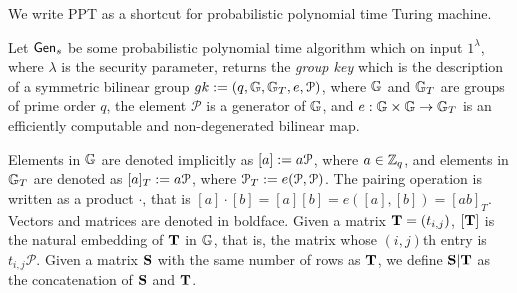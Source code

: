 We write PPT as a shortcut for probabilistic polynomial time Turing machine.

Let $\mathsf{Gen}_s$ be some probabilistic polynomial time algorithm which on input $1^{\lambda}$, where $\lambda$ is the security parameter, returns the \emph{group key} which is the description of a symmetric bilinear group $gk:=(q,\mathbb{G},\mathbb{G}_T,e,\mathcal{P})$, where $\mathbb{G}$
and $\mathbb{G}_T$ are groups of prime order $q$, the element $\mathcal{P}$ is a generator of 
$\mathbb{G}$, and $e:\mathbb{G}\times\mathbb{G}\to\mathbb{G}_T$ is an efficiently computable and non-degenerated bilinear map.

Elements in $\mathbb{G}$ are denoted implicitly as $[a]:=a \mathcal{P}$, where $a\in\mathbb{Z}_q$, and elements in $\mathbb{G}_T$ are denoted as $[a]_T:=a\mathcal{P}$, where $\mathcal{P}_T:=e(\mathcal{P},\mathcal{P})$. 
The pairing operation is written as a product $\cdot$, that is $[a] \cdot [b]=[a] [b]=e([a],[b])=[ab]_T$. Vectors and matrices are denoted in boldface. Given a matrix $\mathbf{{T}}=(t_{i,j})$, $[\mathbf{{T}}]$ is
the natural embedding of $\mathbf{{T}}$ in $\mathbb{G}$, that is, the matrix whose $(i,j)$th entry is $t_{i,j}\mathcal{P}$. Given a matrix $\mathbf{{S}}$ with the same number of rows as $\mathbf{{T}}$, we define $\mathbf{{S}}|\mathbf{{T}}$ as the concatenation of $\mathbf{{S}}$ and $\mathbf{{T}}$.